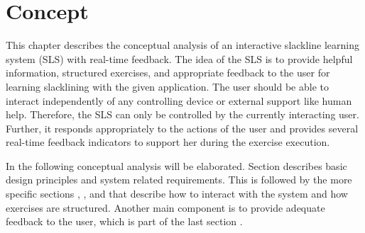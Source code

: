 \chapter{Concept}\label{4_concept}
This chapter describes the conceptual analysis of an interactive slackline learning system (SLS) with real-time feedback. The idea of the SLS is to provide helpful information, structured exercises, and appropriate feedback to the user for learning slacklining with the given application. 
The user should be able to interact independently of any controlling device or external support like human help. Therefore, the SLS can only be controlled by the currently interacting user. Further, it responds appropriately to the actions of the user and provides several real-time feedback indicators to support her during the exercise execution. 

In the following conceptual analysis will be elaborated. Section \textit{} describes basic design principles and system related requirements. This is followed by the more specific sections \textit{}, \textit{}, and \textit{} that describe how to interact with the system and how exercises are structured. Another main component is to provide adequate feedback to the user, which is part of the last section \textit{}. %






